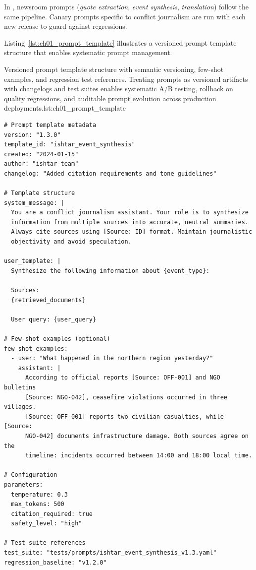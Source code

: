 In \ishtar{}, newsroom prompts (\emph{quote extraction}, \emph{event synthesis}, \emph{translation}) follow the same pipeline. Canary prompts specific to conflict journalism are run with each new release to guard against regressions.  

Listing~\ref{lst:ch01_prompt_template} illustrates a versioned prompt template structure that enables systematic prompt management.

\begin{codebox}{Versioned prompt template structure with semantic versioning, few-shot examples, and regression test references. Treating prompts as versioned artifacts with changelogs and test suites enables systematic A/B testing, rollback on quality regressions, and auditable prompt evolution across production deployments.}{lst:ch01_prompt_template}
\begin{verbatim}
# Prompt template metadata
version: "1.3.0"
template_id: "ishtar_event_synthesis"
created: "2024-01-15"
author: "ishtar-team"
changelog: "Added citation requirements and tone guidelines"

# Template structure
system_message: |
  You are a conflict journalism assistant. Your role is to synthesize
  information from multiple sources into accurate, neutral summaries.
  Always cite sources using [Source: ID] format. Maintain journalistic
  objectivity and avoid speculation.

user_template: |
  Synthesize the following information about {event_type}:

  Sources:
  {retrieved_documents}

  User query: {user_query}

# Few-shot examples (optional)
few_shot_examples:
  - user: "What happened in the northern region yesterday?"
    assistant: |
      According to official reports [Source: OFF-001] and NGO bulletins
      [Source: NGO-042], ceasefire violations occurred in three villages.
      [Source: OFF-001] reports two civilian casualties, while [Source:
      NGO-042] documents infrastructure damage. Both sources agree on the
      timeline: incidents occurred between 14:00 and 18:00 local time.

# Configuration
parameters:
  temperature: 0.3
  max_tokens: 500
  citation_required: true
  safety_level: "high"

# Test suite references
test_suite: "tests/prompts/ishtar_event_synthesis_v1.3.yaml"
regression_baseline: "v1.2.0"
\end{verbatim}
\end{codebox}

